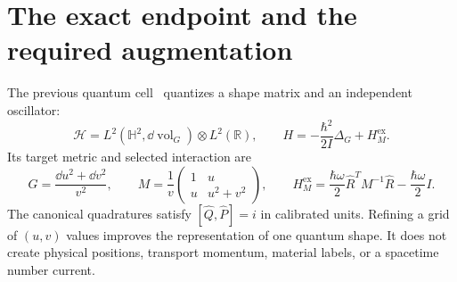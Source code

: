 \documentclass[11pt]{article}
\newcommand{\R}{\mathbb R}\newcommand{\Lip}{\operatorname{Lip}}
\newcommand{\vol}{\operatorname{vol}}\newcommand{\Div}{\operatorname{div}}
\begin{document}
\begin{abstract}
We derive a controlled connection from an augmented quantum regulator to the covariant state-fluid matter model of the preceding research, while retaining a fixed finite geometric field basis. A bounded-observable algebra yields an explicit finite-time concentration estimate for polynomial Hamiltonians and positive square-root terms. A resolvent argument controls both Heisenberg generators and the Fréchet derivatives that define actual sources and stress. Symmetric-probe identities give trace-norm propagation of chaos. The collective relativistic mass produces the proper-time Schrödinger multiplier and the required worldline action. Reciprocal material quadrature then converges before caustics, and strong operator-valued current estimates preserve a specified ordered contact functional. We state the population, phase-space, Fourier, internal, and mollifier dependencies and give a sufficient diagonal. Internal oscillator removal is a separate ordered estimate with uniform moment and common-interval hypotheses. A corrected whole-field linearized theorem also removes a physical spatial lattice on an exact Einstein-dust background. Fixed-occupancy energy, mixed-state, multistream, nonlinear-mass, and weak-current controls show why the assumptions cannot be omitted. The resulting endpoint is a controlled matter continuum with projected geometric equations; the unrestricted nonlinear geometric cutoff and full Einstein constraints remain open.
\end{abstract}
\setcounter{tocdepth}{1}\tableofcontents
\newpage

\section{The exact endpoint and the required augmentation}
The previous quantum cell~\cite{Voss2} quantizes a shape matrix and an independent oscillator:
\[
\mathcal H=L^2(\mathbb H^2,\dd\vol_G)\otimes L^2(\R),
\qquad
H=-\frac{\hbar^2}{2I}\Delta_G+H_M^{\mathrm{ex}}.
\]
Its target metric and selected interaction are
\begin{equation}\label{eq:target}
G=\frac{\dd u^2+\dd v^2}{v^2},\qquad
M=\frac1v\begin{pmatrix}1&u\\u&u^2+v^2\end{pmatrix},
\qquad
H_M^{\mathrm{ex}}=\frac{\hbar\omega}{2}\widehat R^TM^{-1}\widehat R
-\frac{\hbar\omega}{2}I.
\end{equation}
The canonical quadratures satisfy $[\widehat Q,\widehat P]=i$ in calibrated units. Refining a grid of $(u,v)$ values improves the representation of one quantum shape. It does not create physical positions, transport momentum, material labels, or a spacetime number current.
\end{document}
